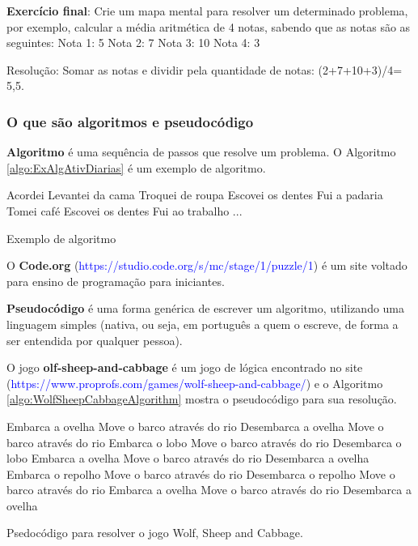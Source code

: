 \documentclass[12pt,a4paper]{article}
\begin{document}
	\textbf{Exercício final}: Crie um mapa mental para resolver um determinado problema, por exemplo, calcular a média aritmética de 4 notas, sabendo que as notas são as seguintes:
	Nota 1: 5
	Nota 2: 7
	Nota 3: 10
	Nota 4: 3
	
	Resolução: Somar as notas e dividir pela quantidade de notas: (2+7+10+3)/4= 5,5.
	
	\subsubsection{O que são algoritmos e pseudocódigo}
	
	\textbf{Algoritmo} é uma sequência de passos que resolve um problema. O Algoritmo \ref{algo:ExAlgAtivDiarias} é um exemplo de algoritmo.
	
	\begin{algorithm}[!htpb]
		\DontPrintSemicolon
		Acordei\;
		Levantei da cama\;
		Troquei de roupa\;
		Escovei os dentes\;
		Fui a padaria\;
		Tomei café\;
		Escovei os dentes\;
		Fui ao trabalho\;
		...\;
		\caption{Exemplo de algoritmo}
		\label{algo:ExAlgAtivDiarias}
	\end{algorithm}

	 O \textbf{Code.org} (\textcolor{blue}{https://studio.code.org/s/mc/stage/1/puzzle/1}) é um site voltado para ensino de programação para iniciantes.
	
	\textbf{Pseudocódigo} é uma forma genérica de escrever um algoritmo, utilizando uma linguagem simples (nativa, ou seja, em português a quem o escreve, de forma a ser entendida por qualquer pessoa).
	
	O jogo \textbf{olf-sheep-and-cabbage} é um jogo de lógica encontrado no site (\textcolor{blue}{https://www.proprofs.com/games/wolf-sheep-and-cabbage/}) e o Algoritmo \ref{algo:WolfSheepCabbageAlgorithm} mostra o pseudocódigo para sua resolução.
	
	\begin{algorithm}[!htpb]
		\DontPrintSemicolon
		Embarca a ovelha\;
		Move o barco através do rio\;
		Desembarca a ovelha\;
		Move o barco através do rio\;
		Embarca o lobo\;
		Move o barco através do rio\;
		Desembarca o lobo\;
		Embarca a ovelha\;
		Move o barco através do rio\;
		Desembarca a ovelha\;
		Embarca o repolho\;
		Move o barco através do rio\;
		Desembarca o repolho\;
		Move o barco através do rio\;
		Embarca a ovelha\;
		Move o barco através do rio\;
		Desembarca a ovelha\;
		\caption{Psedocódigo para resolver o jogo Wolf, Sheep and Cabbage.}
		\label{algo:WolfSheepCabbageAlgorithm}
	\end{algorithm}
	
\end{document}
